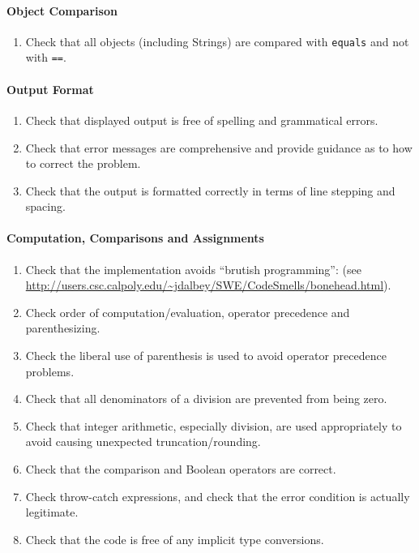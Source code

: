 \paragraph*{Object Comparison}\begin{enumerate}[resume]
\item Check that all objects (including Strings) are compared with \texttt{equals} and not with \texttt{==}.
\end{enumerate}

\paragraph*{Output Format}\begin{enumerate}[resume]
\item Check that displayed output is free of spelling and grammatical errors.
\item Check that error messages are comprehensive and provide guidance as to how to correct the problem.
\item Check that the output is formatted correctly in terms of line stepping and spacing.
\end{enumerate}

\paragraph*{Computation, Comparisons and Assignments}\begin{enumerate}[resume]
\item Check that the implementation avoids ``brutish programming'': (see \url{http://users.csc.calpoly.edu/~jdalbey/SWE/CodeSmells/bonehead.html}). 
\item Check order of computation/evaluation, operator precedence and parenthesizing.
\item Check the liberal use of parenthesis is used to avoid operator precedence problems.
\item Check that all denominators of a division are prevented from being zero.
\item Check that integer arithmetic, especially division, are used appropriately to avoid causing unexpected truncation/rounding.
\item Check that the comparison and Boolean operators are correct.
\item Check throw-catch expressions, and check that the error condition is actually legitimate.
\item Check that the code is free of any implicit type conversions.
\end{enumerate}

